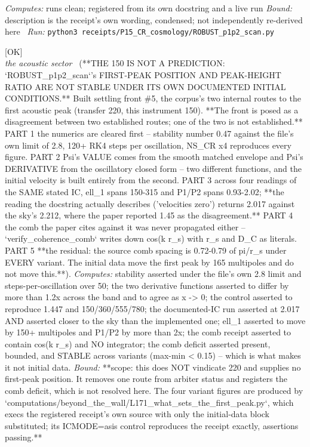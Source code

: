 \begin{description}
\emph{Computes:} runs clean; registered from its own docstring and a live run
 \emph{Bound:} description is the receipt's own wording, condensed; not independently re-derived here
\ \emph{Run:} \texttt{python3 receipts/P15\_CR\_cosmology/ROBUST\_p1p2\_scan.py}
\item[\rcptlabel{P15_the_first_peak_figure_is_not_stable}{P15R61}\textbf{P15R61}\quad\texttt{P15\_the\_first\_peak\_figure\_is\_not\_stable}]\hfill\textsf{[OK]}\\
\textit{the acoustic sector} \ (**THE 150 IS NOT A PREDICTION: `ROBUST\_p1p2\_scan`'s FIRST-PEAK POSITION AND PEAK-HEIGHT RATIO ARE NOT STABLE UNDER ITS OWN DOCUMENTED INITIAL CONDITIONS.** Built settling front \#5, the corpus's two internal routes to the first acoustic peak (transfer 220, this instrument 150). **The front is posed as a disagreement between two established routes; one of the two is not established.** PART 1 the numerics are cleared first -- stability number 0.47 against the file's own limit of 2.8, 120+ RK4 steps per oscillation, NS\_CR x4 reproduces every figure. PART 2 Psi's VALUE comes from the smooth matched envelope and Psi's DERIVATIVE from the oscillatory closed form -- two different functions, and the initial velocity is built entirely from the second. PART 3 across four readings of the SAME stated IC, ell\_1 spans 150-315 and P1/P2 spans 0.93-2.02; **the reading the docstring actually describes ('velocities zero') returns 2.017 against the sky's 2.212, where the paper reported 1.45 as the disagreement.** PART 4 the comb the paper cites against it was never propagated either -- `verify\_coherence\_comb` writes down cos(k r\_s) with r\_s and D\_C as literals. PART 5 **the residual: the source comb spacing is 0.72-0.79 of pi/r\_s under EVERY variant. The initial data move the first peak by 165 multipoles and do not move this.**). 
\emph{Computes:} stability asserted under the file's own 2.8 limit and steps-per-oscillation over 50; the two derivative functions asserted to differ by more than 1.2x across the band and to agree as x -> 0; the control asserted to reproduce 1.447 and 150/360/555/780; the documented-IC run asserted at 2.017 AND asserted closer to the sky than the implemented one; ell\_1 asserted to move by 150+ multipoles and P1/P2 by more than 2x; the comb receipt asserted to contain cos(k r\_s) and NO integrator; the comb deficit asserted present, bounded, and STABLE across variants (max-min < 0.15) -- which is what makes it not initial data.
 \emph{Bound:} **scope: this does NOT vindicate 220 and supplies no first-peak position. It removes one route from arbiter status and registers the comb deficit, which is not resolved here. The four variant figures are produced by `computations/beyond\_the\_wall/L171\_what\_sets\_the\_first\_peak.py`, which execs the registered receipt's own source with only the initial-data block substituted; its ICMODE=asis control reproduces the receipt exactly, assertions passing.**

\end{description}
